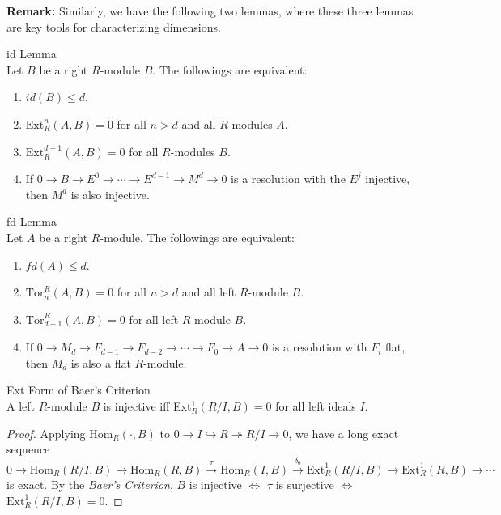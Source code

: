 \noindent\textbf{Remark:} Similarly, we have the following two lemmas, where these three lemmas are key tools for characterizing dimensions.

\begin{lemma}{id Lemma}\\
Let $B$ be a right $R$-module $B$. The followings are equivalent:
\begin{enumerate}
    \item $id (B)\leq d$.
    \item $\text{Ext}_R^n (A,B)=0$ for all $n>d$ and all $R$-modules $A$.
    \item $\text{Ext}_R^{d+1} (A,B)=0$ for all $R$-modules $B$.
    \item If $0\to B\to E^0\to \cdots \to E^{d-1} \to M^d\to0$ is a resolution with the $E^j$ injective, then $M^d$ is also injective.
\end{enumerate}
\end{lemma}

\begin{lemma}{fd Lemma}\\
Let $A$ be a right $R$-module. The followings are equivalent:
\begin{enumerate}
    \item $fd(A)\leq d$.
    \item $\text{Tor}_n^R(A,B)=0$ for all $n>d$ and all left $R$-module $B$.
    \item $\text{Tor}_{d+1}^R (A,B)=0$ for all left $R$-module $B$.
    \item If $0\to M_d \to F_{d-1} \to F_{d-2} \to \cdots \to F_0\to A\to 0$ is a resolution with $F_i$ flat, then $M_d$ is also a flat $R$-module.
\end{enumerate}
\end{lemma}

\begin{lemma}{Ext Form of Baer's Criterion}\\
A left $R$-module $B$ is injective iff Ext$_R^1(R/I,B)=0$ for all left ideals $I$.
\end{lemma}

\begin{proof}
    Applying $\text{Hom}_R(\cdot, B)$ to $0\to I \hookrightarrow R\twoheadrightarrow R/I\to0$, we have a long exact sequence
    \[
    0\to \text{Hom}_R(R/I,B) \to \text{Hom}_R(R,B) \xrightarrow{\tau} \text{Hom}_R(I,B) \xrightarrow{\delta_0} \text{Ext}_R^1(R/I,B) \to \text{Ext}_R^1 (R,B) \to \cdots
    \]
    is exact. By the \textit{Baer's Criterion}, $B$ is injective $\Leftrightarrow$ $\tau$ is surjective $\Leftrightarrow$ $\text{Ext}_R^1 (R/I,B)=0$.
\end{proof}

